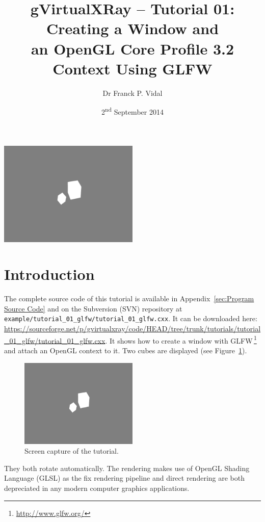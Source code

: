 \documentclass[11pt,oneside,a4paper,final]{article}
\title{gVirtualXRay -- Tutorial 01: Creating a Window and\\an OpenGL Core 
	Profile 3.2 Context Using GLFW}
\author{Dr Franck P. Vidal}
\date{2\textsuperscript{nd} September 2014}
\begin{document}
 \sloppy

\maketitle
\vfill
\begin{center}
\includegraphics[width=0.5\textwidth]{screenshot}
\end{center}
\vfill


 \newpage
{}
{}
\tableofcontents

\ifpdf
\newpage
{}
{}
\listoffigures


{}
{}
\lstlistoflistings
\fi

\newpage


\section{Introduction}

The complete source code of this tutorial is available in 
Appendix~\ref{sec:Program Source Code} and on the Subversion (SVN) repository 
at 
\verb+example/tutorial_01_glfw/tutorial_01_glfw.cxx+. 
It can be downloaded here: 
\url{
https://sourceforge.net/p/gvirtualxray/code/HEAD/tree/trunk/tutorials/tutorial_01_glfw/tutorial_01_glfw.cxx}.
It shows how to create a window with GLFW\,\footnote{\url{http://www.glfw.org/}} 
and attach an OpenGL context to it. 
Two cubes are displayed (see Figure~\ref{fig:scene}). 
\begin{figure}[tbh]
 \centering
 \includegraphics[width=0.5\textwidth]{screenshot}
 \caption{\label{fig:scene} Screen capture of the tutorial.}
\end{figure}
They both rotate automatically. 
The rendering makes use of OpenGL Shading Language (GLSL) as the fix rendering 
pipeline and direct 
rendering are both depreciated in any modern computer graphics applications. 
\end{document}
